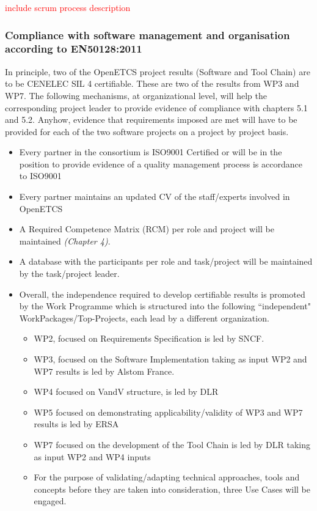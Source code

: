 \documentclass{template/openetcs_article}
\begin{document}
\textcolor{red}{include scrum process description}


\subsubsection{Compliance with software management and organisation according to EN50128:2011}
In principle, two of the OpenETCS project results (Software and Tool Chain) are to be CENELEC \gls{SIL} 4 certifiable. These are two of the results from WP3 and WP7. The following mechanisms, at organizational level, will help the corresponding project leader to provide evidence of compliance with chapters 5.1 and 5.2. Anyhow, evidence that requirements imposed are met will have to be provided for each of the two software projects on a project by project basis. 

\begin{itemize}
\item Every partner in the consortium is ISO9001 Certified or will be in the position to provide evidence of a quality management process is accordance to ISO9001
\item Every partner maintains an updated CV of the staff/experts involved in OpenETCS
\item A Required Competence Matrix (RCM) per role and project will be maintained \textit{(Chapter 4)}.
\item A database with the participants per role and task/project will be maintained by the task/project leader.
\item Overall, the independence required to develop certifiable results is promoted by the Work Programme which is structured into the following “independent" WorkPackages/Top-Projects, each lead by a different organization.  
\begin{itemize}
\item WP2, focused on Requirements Specification is led by SNCF.
\item WP3, focused on the Software Implementation taking as input WP2 and WP7 results is led by Alstom France.
\item WP4 focused on \gls{VandV} structure, is led by DLR
\item WP5 focused on demonstrating applicability/validity of WP3 and WP7 results is led by ERSA
\item WP7 focused on the development of the Tool Chain is led by DLR taking as input WP2 and WP4 inputs
\item For the purpose of validating/adapting technical approaches, tools and concepts before they are taken into consideration, three Use Cases will be engaged.

\end{itemize}
\end{itemize}
\end{document}
